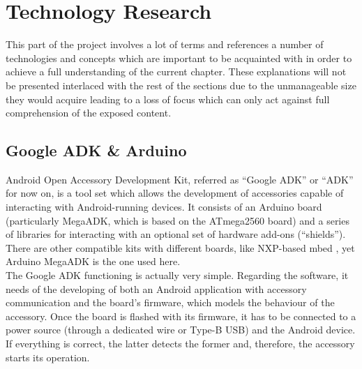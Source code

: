 	\section{Technology Research}
	\label{sec:hw-techs}


	This part of the project involves a lot of terms and references a number of technologies and concepts which are important to be acquainted with in order to achieve a full understanding of the current chapter. These explanations will not be presented interlaced with the rest of the sections due to the unmanageable size they would acquire leading to a loss of focus which can only act against full comprehension of the exposed content.

		\subsection{Google ADK \& Arduino}
		\label{ssec:Arduino}
			Android Open Accessory Development Kit, referred as ``Google ADK'' or ``ADK'' for now on,
			is a tool set which allows the development of accessories capable of interacting with 
			Android-running devices. It consists of an Arduino board (particularly MegaADK, which is based
			on the ATmega2560 board) and a series of libraries for interacting with an optional set of
			hardware add-ons (``shields''). There are other compatible kits with different boards, like
			NXP-based mbed \cite{mbed}, yet Arduino MegaADK is the one used here.\\
			
			The Google ADK functioning is actually very simple. Regarding the software, it needs of 
			the developing of both an Android application with accessory communication and the board's
			firmware, which models the behaviour of the accessory. Once the board is flashed with its
			firmware, it has to be connected to a power source (through a dedicated wire or Type-B USB)
			and the Android device. If everything is correct, the latter detects the former and, therefore, 
			the accessory starts its operation.\\
			

